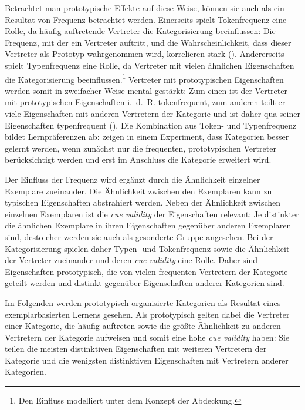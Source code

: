 Betrachtet man prototypische Effekte auf diese Weise, können sie auch als ein Resultat von Frequenz betrachtet werden. Einerseits spielt Tokenfrequenz eine Rolle, da häufig auftretende Vertreter die Kategorisierung beeinflussen: Die Frequenz, mit der ein Vertreter auftritt, und die Wahrscheinlichkeit, dass dieser Vertreter als Prototyp wahrgenommen wird, korrelieren stark (\cite[85]{Goldberg.2006}). Andererseits spielt Typenfrequenz eine Rolle, da Vertreter mit vielen ähnlichen Eigenschaften die Kategorisierung beeinflussen.\footnote{Den Einfluss modelliert \textcite[51--73]{Goldberg.2019} unter dem Konzept der Abdeckung.} Vertreter mit prototypischen Eigenschaften werden somit in zweifacher Weise mental gestärkt: Zum einen ist der Vertreter mit prototypischen Eigenschaften i.~d.~R. tokenfrequent, zum anderen teilt er viele Eigenschaften mit anderen Vertretern der Kategorie und ist daher qua seiner Eigenschaften typenfrequent (\cite[85]{Ellis.2014}). Die Kombination aus Token- und Typenfrequenz bildet Lernpräferenzen ab: \textcite{Elio.1984} zeigen in einem Experiment, dass Kategorien besser gelernt werden, wenn zunächst nur die frequenten, prototypischen Vertreter berücksichtigt werden und erst im Anschluss die Kategorie erweitert wird. 



Der Einfluss der Frequenz wird ergänzt durch die Ähnlichkeit einzelner Exemplare zueinander. Die Ähnlichkeit zwischen den Exemplaren kann zu typischen Eigenschaften abstrahiert werden. Neben der Ähnlichkeit zwischen einzelnen Exemplaren ist die \textit{cue validity} der Eigenschaften relevant: Je distinkter die ähnlichen Exemplare in ihren Eigenschaften gegenüber anderen Exemplaren sind, desto eher werden sie auch als gesonderte Gruppe angesehen.  Bei der Kategorisierung spielen daher Typen- und Tokenfrequenz sowie die Ähnlichkeit der Vertreter zueinander und deren \textit{cue validity} eine Rolle. Daher sind Eigenschaften prototypisch, die von vielen frequenten Vertretern der Kategorie geteilt werden und distinkt gegenüber Eigenschaften anderer Kategorien sind. 

Im Folgenden werden prototypisch organisierte Kategorien als Resultat eines exemplarbasierten Lernens gesehen. Als prototypisch gelten dabei die Vertreter einer Kategorie, die häufig auftreten sowie die größte Ähnlichkeit zu anderen Vertretern der Kategorie aufweisen und somit eine hohe \textit{cue validity} haben: Sie teilen die meisten distinktiven Eigenschaften mit weiteren Vertretern der Kategorie und die wenigsten distinktiven Eigenschaften mit Vertretern anderer Kategorien. 



